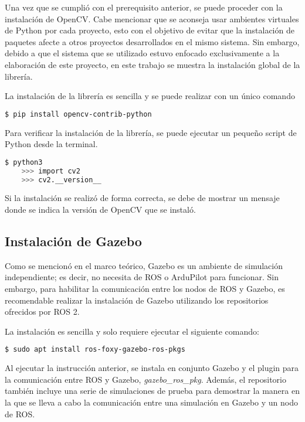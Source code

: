 Una vez que se cumplió con el prerequisito anterior, se puede proceder con la instalación de OpenCV. Cabe mencionar que se aconseja usar ambientes virtuales de Python por cada proyecto, esto con el objetivo de evitar que la instalación de paquetes afecte a otros proyectos desarrollados en el mismo sistema. Sin embargo, debido a que el sistema que se utilizado estuvo enfocado exclusivamente a la elaboración de este proyecto, en este trabajo se muestra la instalación global de la librería.

La instalación de la librería es sencilla y se puede realizar con un único comando

\begin{lstlisting}[language = bash]
    $ pip install opencv-contrib-python
\end{lstlisting}

Para verificar la instalación de la librería, se puede ejecutar un pequeño script de Python desde la terminal.

\begin{lstlisting}[language = bash]
    $ python3
    >>> import cv2
    >>> cv2.__version__
\end{lstlisting}

Si la instalación se realizó de forma correcta, se debe de mostrar un mensaje donde se indica la versión de OpenCV que se instaló.

\subsection{Instalación de Gazebo}

Como se mencionó en el marco teórico, Gazebo es un ambiente de simulación independiente; es decir, no necesita de ROS o ArduPilot para funcionar. Sin embargo, para habilitar la comunicación entre los nodos de ROS y Gazebo, es recomendable realizar la instalación de Gazebo utilizando los repositorios ofrecidos por ROS 2.

La instalación es sencilla y solo requiere ejecutar el siguiente comando:

\begin{lstlisting}[language = bash]
    $ sudo apt install ros-foxy-gazebo-ros-pkgs
\end{lstlisting}

Al ejecutar la instrucción anterior, se instala en conjunto Gazebo y el plugin para la comunicación entre ROS y Gazebo, \textit{gazebo\_ros\_pkg}. Además, el repositorio también incluye una serie de simulaciones de prueba para demostrar la manera en la que se lleva a cabo la comunicación entre una simulación en Gazebo y un nodo de ROS. 

